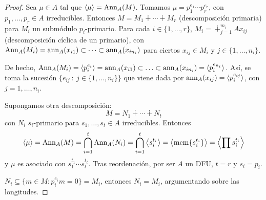 \begin{proof}
  Sea \(\mu \in A\) tal que \(\langle \mu \rangle = \operatorname{Ann}_A(M)\). Tomamos
  \(\mu = p_1^{e_1} \cdots p_r^{e_r}\), con \(p_1, \ldots, p_r \in A\) irreducibles.
  Entonces \(M = M_1 \dotplus \cdots \dotplus M_r\) (descomposición primaria) para
  \(M_i\) un submódulo \(p_i\)-primario. Para cada \(i \in \{1, \ldots, r\}\),
  \(M_i = \dotplus^{m_i}_{j=1} Ax_{ij}\)(descomposición cíclica de un primario),
  con \(\operatorname{Ann}_A(M_i) = \operatorname{ann}_A(x_{i1}) \subset \cdots \subset \operatorname{ann}_A(x_{in_i})\)
  para ciertos \(x_{ij} \in M_i\) y \(j \in \{1, \ldots, n_i\}\).

  De hecho, \(\operatorname{Ann}_A(M_i) = \langle p_i^{e_i} \rangle = \operatorname{ann}_A(x_{i1}) \subset \ldots
  \subset \operatorname{ann}_A(x_{in_i}) = \langle p_i^{e_{n_i}} \rangle\).
  Así, se toma la sucesión \(\{e_{ij} \ : \ j \in \{1, \ldots, n_i\}\}\) que viene dada
  por \(\operatorname{ann}_A(x_{ij}) = \langle p_i^{e_{ij}} \rangle \), con \(j = 1, \ldots, n_i\).
  
  Supongamos otra descomposición:
  \[
    M=N_1\dotplus \cdots \dotplus N_t
  \]
  con \(N_i\) \(s_i\)-primario para \(s_1,\ldots,s_t\in A\) irreducibles.
  Entonces
  \[
    \left\langle \mu\right\rangle =\operatorname{Ann}_A(M)=\bigcap_{i=1}^t \operatorname{Ann}_A(N_i)
    =\bigcap_{i=1}^t\left\langle s_i^{t_i}\right\rangle
    = \left\langle\operatorname{mcm}\{s_i^{t_i}\}\right\rangle=\left\langle\prod s_i^{t_i}\right\rangle
  \]
  y \(\mu\) es asociado con \(s_1^{t_1}\cdots s_t^{t_t}\).
  Tras reordenación, por ser \(A\) un DFU, \(t=r\) y \(s_i=p_i\).

  \(N_i\subseteq\{m\in M:p_i^{e_i} m=0\}=M_i\), entonces
  \(N_i=M_i\), argumentando sobre las longitudes.
\end{proof}
